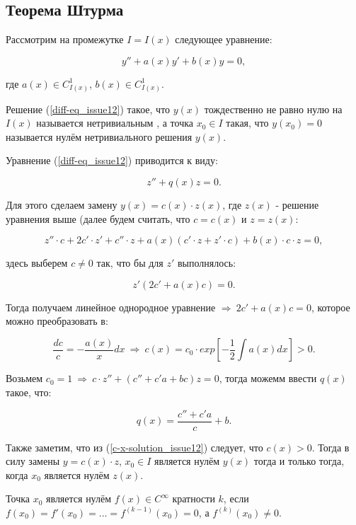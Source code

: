 \subsection{Теорема Штурма}

Рассмотрим на промежутке $I = I(x)$ следующее уравнение:

\begin{equation}\label{diff-eq_issue12}
y'' + a(x)y' + b(x)y = 0,
\end{equation}

где $a(x) \in C^1_{I(x)}$, $b(x) \in C^1_{I(x)}$.

Решение (\ref{diff-eq_issue12}) такое, что $y(x)$ тождественно не равно нулю на $I(x)$ называется нетривиальным , а точка $x_0 \in I$ такая, что $y(x_0) = 0$ называется нулём нетривиального решения $y(x)$.

Уравнение (\ref{diff-eq_issue12}) приводится к виду:

\begin{equation}\label{diff-eq_z-form_issue12}
z'' + q(x)z = 0.
\end{equation}

Для этого сделаем замену $y(x) = c(x) \cdot z(x)$, где $z(x)$ - решение уравнения выше (далее будем считать, что $c = c(x)$ и $z = z(x)$:

\[z''\cdot c + 2c' \cdot z' + c'' \cdot z + a(x) (c' \cdot z + z' \cdot c) + b(x) \cdot c \cdot z = 0,\]

здесь выберем $c \neq 0$ так, что бы для $z'$ выполнялось:

\[z' (2c' + a(x) c) = 0.\]

Тогда получаем линейное однородное уравнение $\Rightarrow \: 2c' + a(x)c = 0$, которое можно преобразовать в:

\begin{equation}\label{c-x-solution_issue12}
\frac{dc}{c} = - \frac{a(x)}{x}dx\: \Rightarrow \: c(x) = c_0 \cdot exp \left[-\frac{1}{2} \int a(x)dx\right] > 0.
\end{equation}

Возьмем $c_0 = 1 \: \Rightarrow \: c \cdot z'' + (c'' + c'a + bc)z = 0$, тогда можемм ввести $q(x)$ такое, что:

\[q(x) = \frac{c'' + c'a}{c} + b.\]

Также заметим, что из (\ref{c-x-solution_issue12}) следует, что $c(x) > 0$. Тогда в силу замены $y = c(x) \cdot z$, $x_0 \in I$ является нулём $y(x)$ тогда и только тогда, когда $x_0$ является нулём $z(x)$.

\begin{definition}
Точка $x_0$ является нулём $f(x) \in C^{\infty}$ кратности $k$, если $f(x_0) = f'(x_0) = ... = f^{(k-1)}(x_0) = 0$, а $f^{(k)}(x_0) \neq 0$.
\end{definition}

